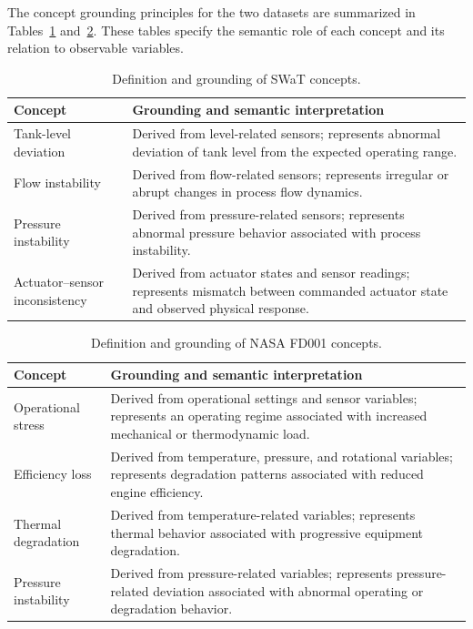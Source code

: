 \documentclass[runningheads]{llncs}
\begin{document}
The concept grounding principles for the two datasets are summarized in Tables~\ref{tab:concept_grounding_swat} and~\ref{tab:concept_grounding_fd001}. These tables specify the semantic role of each concept and its relation to observable variables.

\begin{table}[tbp]
\caption{Definition and grounding of SWaT concepts.}
\label{tab:concept_grounding_swat}
\centering
\scriptsize
\setlength{\tabcolsep}{4pt}
\renewcommand{\arraystretch}{1.15}
\begin{tabularx}{\textwidth}{p{} X}
\toprule
Concept & Grounding and semantic interpretation \\
\midrule
Tank-level deviation &
Derived from level-related sensors; represents abnormal deviation of tank level from the expected operating range. \\

Flow instability &
Derived from flow-related sensors; represents irregular or abrupt changes in process flow dynamics. \\

Pressure instability &
Derived from pressure-related sensors; represents abnormal pressure behavior associated with process instability. \\

Actuator--sensor inconsistency &
Derived from actuator states and sensor readings; represents mismatch between commanded actuator state and observed physical response. \\
\bottomrule
\end{tabularx}
\end{table}

\begin{table}[tbp]
\caption{Definition and grounding of NASA FD001 concepts.}
\label{tab:concept_grounding_fd001}
\centering
\scriptsize
\setlength{\tabcolsep}{4pt}
\renewcommand{\arraystretch}{1.15}
\begin{tabularx}{\textwidth}{p{} X}
\toprule
Concept & Grounding and semantic interpretation \\
\midrule
Operational stress &
Derived from operational settings and sensor variables; represents an operating regime associated with increased mechanical or thermodynamic load. \\

Efficiency loss &
Derived from temperature, pressure, and rotational variables; represents degradation patterns associated with reduced engine efficiency. \\

Thermal degradation &
Derived from temperature-related variables; represents thermal behavior associated with progressive equipment degradation. \\

Pressure instability &
Derived from pressure-related variables; represents pressure-related deviation associated with abnormal operating or degradation behavior. \\
\bottomrule
\end{tabularx}
\end{table}
\end{document}
